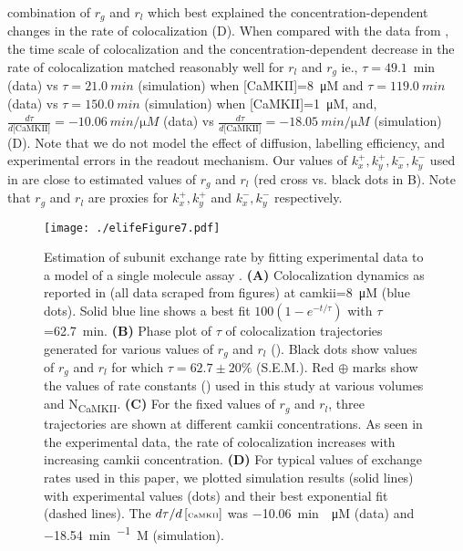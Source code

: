 \documentclass[9pt,lineno,doublespacing]{elife}
\newcommand\SUB[2]{#1\textsubscript{#2}}
\begin{document}
combination of $r_g$ and $r_l$ which best explained the concentration-dependent
changes in the rate of colocalization (D). When
compared with the data from \cite{stratton_activation-triggered_2014}, the time
scale of colocalization and the concentration-dependent decrease in the rate of
colocalization matched reasonably well for $r_l$ and $r_g$ ie.,
$\tau=\SI{49.1}{\min}$ (data) vs $\tau=\SI{21.0}{min}$ (simulation) when
[CaMKII]=\SI{8}{\micro M} and $\tau=\SI{119.0}{min}$ (data) vs
$\tau=\SI{150.0}{min}$ (simulation) when [CaMKII]=\SI{1}{\micro M}, and,
$\frac{d\tau}{d\text{[CaMKII]}}=\SI{-10.06}{min\per\micro M}$ (data) vs
$\frac{d\tau}{d\text{[CaMKII]}}=\SI{-18.05}{min\per\micro M}$ (simulation)
(D). Note that we do not model the effect of
diffusion, labelling efficiency, and experimental errors in the readout 
mechanism.
Our values of $k_x^+, k_y^+, k_x^-, k_y^-$ used in  are close to
estimated values of $r_g$ and $r_l$ (red cross vs. black dots in
B). Note that $r_g$ and $r_l$ are proxies for
$k_x^+,k_y^+$ and $k_x^-, k_y^-$ respectively.

\begin{figure}[ht!]
    \texttt{[image: ./elifeFigure7.pdf]}
    \caption{Estimation of subunit exchange rate by fitting experimental
        data to a model of  a single molecule assay \cite{stratton_activation-triggered_2014}. 
        \textbf{(A)} Colocalization dynamics as reported in 
        \cite{stratton_activation-triggered_2014} (all data scraped from figures) at
        \gls{camkii}=\SI{8}{\micro M} (blue dots). Solid blue line shows a best
        fit $100(1-e^{-t/\tau})$ with $\tau$=\SI{62.7}{min}. 
        \textbf{(B)} Phase plot of $\tau$ of colocalization trajectories generated 
        for various values of $r_g$ and $r_l$ (). Black dots show values
        of $r_g$ and $r_l$ for which $\tau=62.7\pm 20\%$ (S.E.M.). Red
        $\oplus$ marks show the values of rate constants () 
        used in this study at various volumes and \SUB{N}{CaMKII}. 
        \textbf{(C)} For the fixed values of $r_g$ and $r_l$, three trajectories 
        are shown at different \gls{camkii} concentrations. As seen in the experimental data, 
        the rate of colocalization increases with increasing \gls{camkii} concentration. 
        \textbf{(D)} For typical values of exchange rates used in this paper, we plotted
        simulation results (solid lines) with experimental values (dots) and their best
        exponential fit (dashed lines). The ${d\tau}/{d\left[\text{\tiny CaMKII}\right]}$ 
        was \SI{-10.06}{min \per \micro M} (data) and \SI{-18.54}{min\per\micro
        M} (simulation).
    }\label{fig:estimate_of_exchange_rate}
\end{figure}
\end{document}
